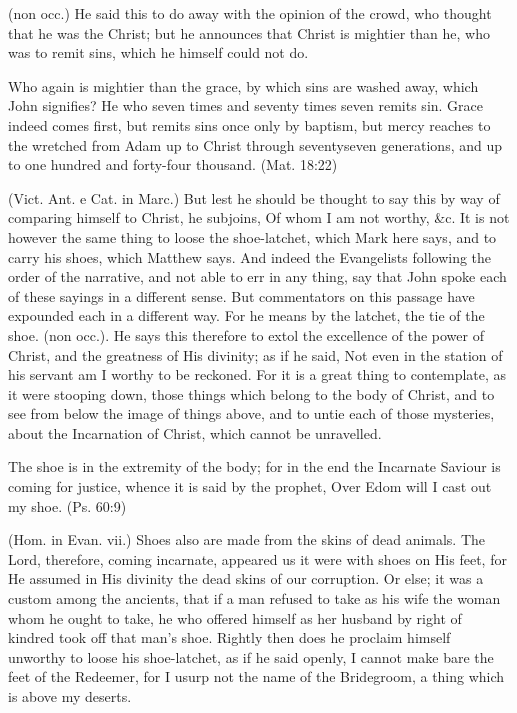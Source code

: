  (non occ.) He said this to do away with the opinion of the crowd, who thought that he was the Christ; but he announces that Christ is mightier than he, who was to remit sins, which he himself could not do.

 Who again is mightier than the grace, by which sins are washed away, which John signifies? He who seven times and seventy times seven remits sin. Grace indeed comes first, but remits sins once only by baptism, but mercy reaches to the wretched from Adam up to Christ through seventyseven generations, and up to one hundred and forty-four thousand. (Mat. 18:22)

 (Vict. Ant. e Cat. in Marc.) But lest he should be thought to say this by way of comparing himself to Christ, he subjoins, Of whom I am not worthy, \&c. It is not however the same thing to loose the shoe-latchet, which Mark here says, and to carry his shoes, which Matthew says. And indeed the Evangelists following the order of the narrative, and not able to err in any thing, say that John spoke each of these sayings in a different sense. But commentators on this passage have expounded each in a different way. For he means by the latchet, the tie of the shoe. (non occ.). He says this therefore to extol the excellence of the power of Christ, and the greatness of His divinity; as if he said, Not even in the station of his servant am I worthy to be reckoned. For it is a great thing to contemplate, as it were stooping down, those things which belong to the body of Christ, and to see from below the image of things above, and to untie each of those mysteries, about the Incarnation of Christ, which cannot be unravelled.

 The shoe is in the extremity of the body; for in the end the Incarnate Saviour is coming for justice, whence it is said by the prophet, Over Edom will I cast out my shoe. (Ps. 60:9)

 (Hom. in Evan. vii.) Shoes also are made from the skins of dead animals. The Lord, therefore, coming incarnate, appeared us it were with shoes on His feet, for He assumed in His divinity the dead skins of our corruption. Or else; it was a custom among the ancients, that if a man refused to take as his wife the woman whom he ought to take, he who offered himself as her husband by right of kindred took off that man’s shoe. Rightly then does he proclaim himself unworthy to loose his shoe-latchet, as if he said openly, I cannot make bare the feet of the Redeemer, for I usurp not the name of the Bridegroom, a thing which is above my deserts.

